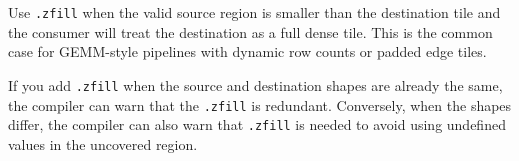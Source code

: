 Use \texttt{.zfill} when the valid source region is smaller than the destination tile and the consumer will treat the destination as a full dense tile. This is the common case for GEMM-style pipelines with dynamic row counts or padded edge tiles.

If you add \texttt{.zfill} when the source and destination shapes are already the same, the compiler can warn that the \texttt{.zfill} is redundant. Conversely, when the shapes differ, the compiler can also warn that \texttt{.zfill} is needed to avoid using undefined values in the uncovered region.
